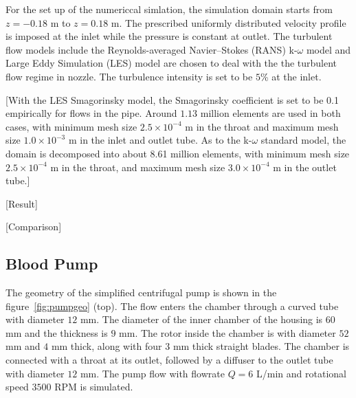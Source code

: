 For the set up of the numericcal simlation, the simulation domain starts from $z=-0.18$ m to $z=0.18$ m. The prescribed uniformly distributed velocity profile is imposed at the inlet while the pressure is constant at outlet. The turbulent flow models include the Reynolds-averaged Navier–Stokes (RANS) k-$\omega$ model and Large Eddy Simulation (LES) model are chosen to deal with the the turbulent flow regime in nozzle. The turbulence intensity is set to be $5$\% at the inlet. 

[With the LES Smagorinsky model, the Smagorinsky coefficient is set to be 0.1 empirically for flows in the pipe. Around $1.13$ million elements are used in both cases, with minimum mesh size $2.5\times10^{-4}$ m in the throat and maximum mesh size $1.0\times10^{-3}$ m in the inlet and outlet tube. As to the k-$\omega$ standard model, the domain is decomposed into about 8.61 million elements, with minimum mesh size $2.5\times10^{-4}$ m in the throat, and maximum mesh size $3.0\times10^{-4}$ m in the outlet tube.]  

[Result]

[Comparison]

\subsection{Blood Pump}

The geometry of the simplified centrifugal pump is shown in the figure~\ref{fig:pumpgeo} (top). The flow enters the chamber through a curved tube with diameter $12$ mm. The diameter of the inner chamber of the housing is $60$ mm and the thickness is $9$ mm. The rotor inside the chamber is with diameter $52$ mm and $4$ mm thick, along with four $3$ mm thick straight blades. The chamber is connected with a throat at its outlet, followed by a diffuser to the outlet tube with diameter $12$ mm. The pump flow with flowrate $Q = 6$ L/min and rotational speed $3500$ RPM is simulated. 

